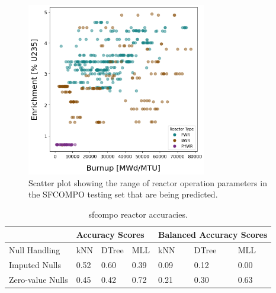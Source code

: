 \begin{figure}[!ht]
    \centering
    \includegraphics[width=0.7\textwidth]{./chapters/exp1/sfcompo_scatter_viz.png}
    \caption{Scatter plot showing the range of reactor operation parameters in 
             the \gls{SFCOMPO} testing set that are being predicted.}
    \label{fig:sfcoscatter}
\end{figure}



\begin{table}[!ht]
  \centering
  \begin{tabular}{@{}l|lll|lll@{}}
  \toprule
                   & \multicolumn{3}{l|}{Accuracy Scores} & \multicolumn{3}{l}{Balanced Accuracy Scores} \\ \toprule
  Null Handling    & kNN        & DTree      & MLL       & kNN           & DTree         & MLL           \\ \midrule
  Imputed Nulls    & 0.52       & 0.60       & 0.39      & 0.09          & 0.12          & 0.00          \\
  Zero-value Nulls & 0.45       & 0.42       & 0.72      & 0.21          & 0.30          & 0.63          \\ \bottomrule
  \end{tabular}
  \caption{sfcompo reactor accuracies.}
  \label{tbl:sfcorxtr}
\end{table}

